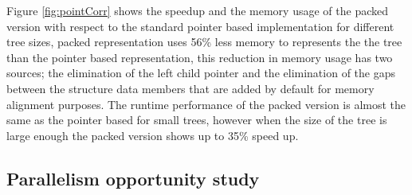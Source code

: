 \documentclass[a4paper,english]{lipics-v2016}
\begin{document}
  
Figure \ref{fig:pointCorr} shows the speedup and the memory usage of the  packed version  with respect to the standard pointer based implementation for different tree sizes,
packed representation uses 56\% less memory to represents the the tree than the pointer based representation, this reduction in memory usage has two sources;
the elimination of the left child pointer and the elimination of the gaps between the structure data members that are added by default for memory alignment purposes.
The runtime performance of the packed version is almost the same as the pointer based for small trees, however when the size of the tree is large enough the packed version 
shows up to 35\% speed up.



\subsection{Parallelism opportunity study} \label{sec:eval-parallelism}


\end{document}
